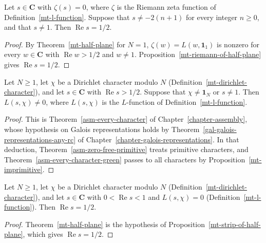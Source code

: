 \begin{theorem}\label{mt-riemann-hypothesis}
Let $s\in\mathbf C$ with $\zeta(s)=0$, where $\zeta$ is the Riemann zeta function of
Definition~\ref{mt-l-function}. Suppose that $s\neq-2(n+1)$ for every integer $n\geq0$, and that
$s\neq1$. Then $\operatorname{Re}s=1/2$.
\end{theorem}
\begin{proof}
By Theorem~\ref{mt-half-plane} for $N=1$, $\zeta(w)=L(w,\mathbf 1_1)$ is nonzero for every
$w\in\mathbf C$ with $\operatorname{Re}w>1/2$ and $w\neq1$. Proposition~\ref{mt-riemann-of-half-plane}
gives $\operatorname{Re}s=1/2$.
\end{proof}

\begin{theorem}\label{mt-half-plane}
Let $N\geq1$, let $\chi$ be a Dirichlet character modulo $N$
(Definition~\ref{mt-dirichlet-character}), and let $s\in\mathbf C$ with $\operatorname{Re}s>1/2$.
Suppose that $\chi\neq\mathbf 1_N$ or $s\neq1$. Then $L(s,\chi)\neq0$, where $L(s,\chi)$ is the
$L$-function of Definition~\ref{mt-l-function}.
\end{theorem}
\begin{proof}
This is Theorem~\ref{asm-every-character} of Chapter~\ref{chapter-assembly}, whose hypothesis on
Galois representations holds by Theorem~\ref{gal-galois-representations-any-rc} of
Chapter~\ref{chapter-galois-representations}. In that deduction,
Theorem~\ref{asm-zero-free-primitive} treats primitive characters, and
Theorem~\ref{asm-every-character-green} passes to all characters by
Proposition~\ref{mt-imprimitive}.
\end{proof}

\begin{theorem}\label{mt-strip}
Let $N\geq1$, let $\chi$ be a Dirichlet character modulo $N$
(Definition~\ref{mt-dirichlet-character}), and let $s\in\mathbf C$ with $0<\operatorname{Re}s<1$ and
$L(s,\chi)=0$ (Definition~\ref{mt-l-function}). Then $\operatorname{Re}s=1/2$.
\end{theorem}
\begin{proof}
Theorem~\ref{mt-half-plane} is the hypothesis of Proposition~\ref{mt-strip-of-half-plane}, which
gives $\operatorname{Re}s=1/2$.
\end{proof}

